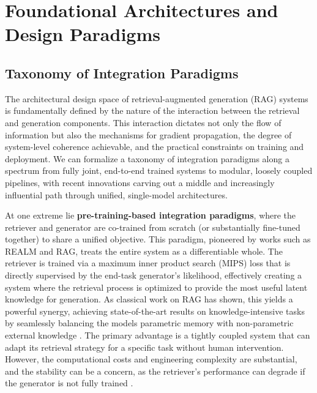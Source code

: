 \documentclass[11pt,a4paper]{article}
\begin{document}
\section{Foundational Architectures and Design Paradigms}



\subsection{Taxonomy of Integration Paradigms}


The architectural design space of retrieval-augmented generation (RAG) systems is fundamentally defined by the nature of the interaction between the retrieval and generation components. This interaction dictates not only the flow of information but also the mechanisms for gradient propagation, the degree of system-level coherence achievable, and the practical constraints on training and deployment. We can formalize a taxonomy of integration paradigms along a spectrum from fully joint, end-to-end trained systems to modular, loosely coupled pipelines, with recent innovations carving out a middle and increasingly influential path through unified, single-model architectures.

At one extreme lie \textbf{pre-training-based integration paradigms}, where the retriever and generator are co-trained from scratch (or substantially fine-tuned together) to share a unified objective. This paradigm, pioneered by works such as REALM and RAG, treats the entire system as a differentiable whole. The retriever is trained via a maximum inner product search (MIPS) loss that is directly supervised by the end-task generator's likelihood, effectively creating a system where the retrieval process is optimized to provide the most useful latent knowledge for generation. As classical work on RAG has shown, this yields a powerful synergy, achieving state-of-the-art results on knowledge-intensive tasks by seamlessly balancing the models parametric memory with non-parametric external knowledge \cite{arxiv:2005.11401v4,arxiv:2312.10997v5}. The primary advantage is a tightly coupled system that can adapt its retrieval strategy for a specific task without human intervention. However, the computational costs and engineering complexity are substantial, and the stability can be a concern, as the retriever's performance can degrade if the generator is not fully trained \cite{arxiv:2506.00054v1}.
\end{document}

